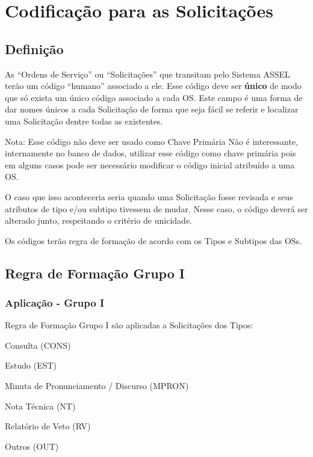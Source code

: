 \chapter{Codificação para as Solicitações}
\label{ref:codigos}

\section{Definição}

As ``Ordens de Serviço'' ou ``Solicitações'' que transitam pelo Sistema ASSEL terão um código ``humano'' associado a ele. Esse código deve ser \textbf{único} de modo que só exista um único código associado a cada OS. Este campo é uma forma de dar nomes únicos a cada Solicitação de forma que seja fácil se referir e localizar uma Solicitação dentre todas as existentes.


\begin{nota}[1]{Nota: Esse código não deve ser usado como Chave Primária}
	Não é interessante, internamente no banco de dados, utilizar esse código como chave primária pois em alguns casos pode ser necessário modificar o código inicial atribuído a uma OS. 	
	
	O caso que isso aconteceria seria quando uma Solicitação fosse revisada e seus atributos de tipo e/ou subtipo tivessem de mudar. Nesse caso, o código deverá ser alterado junto, respeitando o critério de unicidade.
\end{nota}


Os códigos terão regra de formação de acordo com os Tipos e Subtipos das OSs.

\section{Regra de Formação Grupo I}

\subsection{Aplicação - Grupo I}

\begin{env-aplica}{Regra de Formação Grupo I são aplicadas a Solicitações dos Tipos:}
	\item Consulta (CONS)
	\item Estudo (EST)
	\item Minuta de Pronunciamento / Discurso (MPRON)
	\item Nota Técnica (NT)
	\item Relatório de Veto (RV)
	\item Outros (OUT)	
\end{env-aplica}

